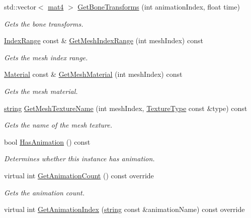\begin{DoxyCompactItemize}
std\+::vector$<$ \hyperlink{_types_8h_a2db59f395fe82a7394c6324956c265d8}{mat4} $>$ \hyperlink{class_model_a1b4973c45bab30dc87b4d977a9ef741e}{Get\+Bone\+Transforms} (int animation\+Index, float time)
\begin{DoxyCompactList}\small\item\em Gets the bone transforms. \end{DoxyCompactList}\item 
\hyperlink{struct_index_range}{Index\+Range} const \& \hyperlink{class_model_a24eb1631a6274af5e2df089f3cb18ac8}{Get\+Mesh\+Index\+Range} (int mesh\+Index) const 
\begin{DoxyCompactList}\small\item\em Gets the mesh index range. \end{DoxyCompactList}\item 
\hyperlink{class_material}{Material} const \& \hyperlink{class_model_a6266aadeb0b38caa954034c4c914817a}{Get\+Mesh\+Material} (int mesh\+Index) const 
\begin{DoxyCompactList}\small\item\em Gets the mesh material. \end{DoxyCompactList}\item 
\hyperlink{_types_8h_ad453f9f71ce1f9153fb748d6bb25e454}{string} \hyperlink{class_model_a431c226c7b320ac663925784097b9be8}{Get\+Mesh\+Texture\+Name} (int mesh\+Index, \hyperlink{_material_8h_a65468556d79304b3a4bfc464cc12e549}{Texture\+Type} const \&type) const 
\begin{DoxyCompactList}\small\item\em Gets the name of the mesh texture. \end{DoxyCompactList}\item 
bool \hyperlink{class_model_a1b13528a1be8e78385821d4a4c659ef6}{Has\+Animation} () const 
\begin{DoxyCompactList}\small\item\em Determines whether this instance has animation. \end{DoxyCompactList}\item 
virtual int \hyperlink{class_model_abe060d2f37024cf705a2c658f45ee76d}{Get\+Animation\+Count} () const  override
\begin{DoxyCompactList}\small\item\em Gets the animation count. \end{DoxyCompactList}\item 
virtual int \hyperlink{class_model_a42eaac921087da9ba23a8700d9795db7}{Get\+Animation\+Index} (\hyperlink{_types_8h_ad453f9f71ce1f9153fb748d6bb25e454}{string} const \&animation\+Name) const  override

\end{DoxyCompactItemize}
